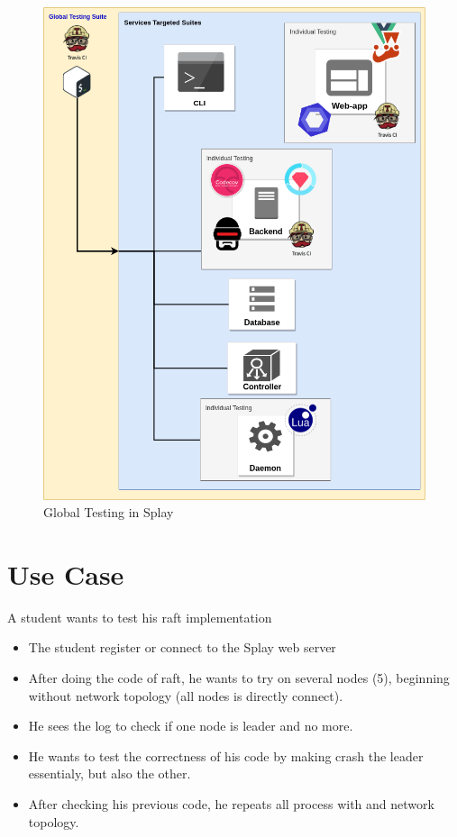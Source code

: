 \documentclass{eplmastersthesis}
\begin{document}
      \begin{figure}[H]
        \centering
        \includegraphics[scale=0.6]{figures/global_testing.png}
        \caption{\label{global_testing} Global Testing in Splay}
      \end{figure}

  \chapter{Use Case}
  A student wants to test his raft implementation
    \begin{itemize}
      \item The student register or connect to the Splay web server
      \item After doing the code of raft, he wants to try on several nodes (5),
      beginning without network topology (all nodes is directly connect).
      \item He sees the log to check if one node is leader and no more.
      \item He wants to test the correctness of his code by making crash the
      leader essentialy,
      but also the other.
      \item After checking his previous code, he repeats all process with and
      network topology.
    \end{itemize}
\end{document}
